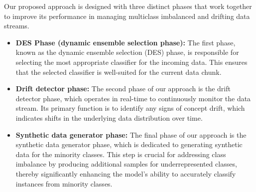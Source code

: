 Our proposed approach is designed with three distinct phases that work together to improve its performance in managing multiclass imbalanced and drifting data streams. 
\begin{itemize}
	\item \textbf{DES Phase (dynamic ensemble selection phase):} The first phase, known as the dynamic ensemble selection (DES) phase, is responsible for selecting the most appropriate classifier for the incoming data. This ensures that the selected classifier is well-suited for the current data chunk.
	\item \textbf{Drift detector phase:} The second phase of our approach is the drift detector phase, which operates in real-time to continuously monitor the data stream. Its primary function is to identify any signs of concept drift, which indicates shifts in the underlying data distribution over time.
	\item \textbf{Synthetic data generator phase:} The final phase of our approach is the synthetic data generator phase, which is dedicated to generating synthetic data for the minority classes. This step is crucial for addressing class imbalance by producing additional samples for underrepresented classes, thereby significantly enhancing the model's ability to accurately classify instances from minority classes.
\end{itemize}

